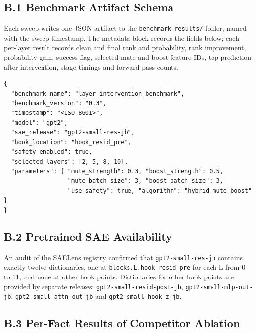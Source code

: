\documentclass[12pt,a4paper]{report}
\begin{document}
\subsection*{B.1 Benchmark Artifact Schema}
Each sweep writes one JSON artifact to the \texttt{benchmark\_\allowbreak{}results/\allowbreak } folder, named with the sweep timestamp. The metadata block records the fields below; each per-layer result records clean and final rank and probability, rank improvement, probability gain, success flag, selected mute and boost feature IDs, top prediction after intervention, stage timings and forward-pass counts.

\begin{lstlisting}[title={Listing B.1: Artifact metadata (abridged)}]
{
  "benchmark_name": "layer_intervention_benchmark",
  "benchmark_version": "0.3",
  "timestamp": "<ISO-8601>",
  "model": "gpt2",
  "sae_release": "gpt2-small-res-jb",
  "hook_location": "hook_resid_pre",
  "safety_enabled": true,
  "selected_layers": [2, 5, 8, 10],
  "parameters": { "mute_strength": 0.3, "boost_strength": 0.5,
                  "mute_batch_size": 3, "boost_batch_size": 3,
                  "use_safety": true, "algorithm": "hybrid_mute_boost" }
}
\end{lstlisting}

\subsection*{B.2 Pretrained SAE Availability}
An audit of the SAELens registry confirmed that \texttt{gpt2-small-res-jb} contains exactly twelve dictionaries, one at \texttt{blocks.\allowbreak{}L.\allowbreak{}hook\_\allowbreak{}resid\_\allowbreak{}pre} for each L from 0 to 11, and none at other hook points. Dictionaries for other hook points are provided by separate releases: \texttt{gpt2-small-resid-post-jb}, \texttt{gpt2-small-mlp-out-jb}, \texttt{gpt2-small-attn-out-jb} and \texttt{gpt2-small-hook-z-jb}.

\subsection*{B.3 Per-Fact Results of Competitor Ablation}
\end{document}
